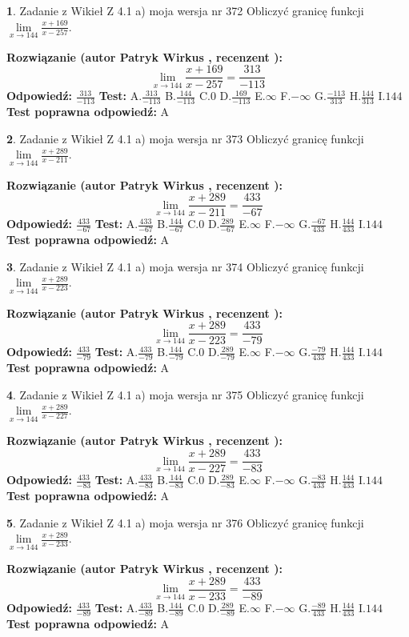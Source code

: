 \documentclass[12pt, a4paper]{article}
\theoremstyle{definition} %
\newtheorem{zad}{}
\newcommand{\zadStart}[1]{\begin{zad}#1\newline}
\newcommand{\zadStop}{\end{zad}}
\newcommand{\rozwStart}[2]{\noindent \textbf{Rozwiązanie (autor #1 , recenzent #2): }\newline}
\newcommand{\rozwStop}{\newline}
\newcommand{\odpStart}{\noindent \textbf{Odpowiedź:}\newline}
\newcommand{\odpStop}{\newline}
\newcommand{\testStart}{\noindent \textbf{Test:}\newline}
\newcommand{\testStop}{\newline}
\newcommand{\kluczStart}{\noindent \textbf{Test poprawna odpowiedź:}\newline}
\newcommand{\kluczStop}{\newline}
\begin{document}
\zadStart{Zadanie z Wikieł Z 4.1 a) moja wersja nr 372}
Obliczyć granicę funkcji $\lim\limits_{x\to144}\frac{x+169}{x-257}$.
\zadStop
\rozwStart{Patryk Wirkus}{}
$$\lim\limits_{x\to144}\frac{x+169}{x-257} = \frac{313}{-113}$$
\rozwStop
\odpStart
$\frac{313}{-113}$
\odpStop
\testStart
A.$\frac{313}{-113}$
B.$\frac{144}{-113}$
C.$0$
D.$\frac{169}{-113}$
E.$\infty$
F.$-\infty$
G.$\frac{-113}{313}$
H.$\frac{144}{313}$
I.$144$
\testStop
\kluczStart
A
\kluczStop



\zadStart{Zadanie z Wikieł Z 4.1 a) moja wersja nr 373}
Obliczyć granicę funkcji $\lim\limits_{x\to144}\frac{x+289}{x-211}$.
\zadStop
\rozwStart{Patryk Wirkus}{}
$$\lim\limits_{x\to144}\frac{x+289}{x-211} = \frac{433}{-67}$$
\rozwStop
\odpStart
$\frac{433}{-67}$
\odpStop
\testStart
A.$\frac{433}{-67}$
B.$\frac{144}{-67}$
C.$0$
D.$\frac{289}{-67}$
E.$\infty$
F.$-\infty$
G.$\frac{-67}{433}$
H.$\frac{144}{433}$
I.$144$
\testStop
\kluczStart
A
\kluczStop



\zadStart{Zadanie z Wikieł Z 4.1 a) moja wersja nr 374}
Obliczyć granicę funkcji $\lim\limits_{x\to144}\frac{x+289}{x-223}$.
\zadStop
\rozwStart{Patryk Wirkus}{}
$$\lim\limits_{x\to144}\frac{x+289}{x-223} = \frac{433}{-79}$$
\rozwStop
\odpStart
$\frac{433}{-79}$
\odpStop
\testStart
A.$\frac{433}{-79}$
B.$\frac{144}{-79}$
C.$0$
D.$\frac{289}{-79}$
E.$\infty$
F.$-\infty$
G.$\frac{-79}{433}$
H.$\frac{144}{433}$
I.$144$
\testStop
\kluczStart
A
\kluczStop



\zadStart{Zadanie z Wikieł Z 4.1 a) moja wersja nr 375}
Obliczyć granicę funkcji $\lim\limits_{x\to144}\frac{x+289}{x-227}$.
\zadStop
\rozwStart{Patryk Wirkus}{}
$$\lim\limits_{x\to144}\frac{x+289}{x-227} = \frac{433}{-83}$$
\rozwStop
\odpStart
$\frac{433}{-83}$
\odpStop
\testStart
A.$\frac{433}{-83}$
B.$\frac{144}{-83}$
C.$0$
D.$\frac{289}{-83}$
E.$\infty$
F.$-\infty$
G.$\frac{-83}{433}$
H.$\frac{144}{433}$
I.$144$
\testStop
\kluczStart
A
\kluczStop



\zadStart{Zadanie z Wikieł Z 4.1 a) moja wersja nr 376}
Obliczyć granicę funkcji $\lim\limits_{x\to144}\frac{x+289}{x-233}$.
\zadStop
\rozwStart{Patryk Wirkus}{}
$$\lim\limits_{x\to144}\frac{x+289}{x-233} = \frac{433}{-89}$$
\rozwStop
\odpStart
$\frac{433}{-89}$
\odpStop
\testStart
A.$\frac{433}{-89}$
B.$\frac{144}{-89}$
C.$0$
D.$\frac{289}{-89}$
E.$\infty$
F.$-\infty$
G.$\frac{-89}{433}$
H.$\frac{144}{433}$
I.$144$
\testStop
\kluczStart
A
\kluczStop
\end{document}

